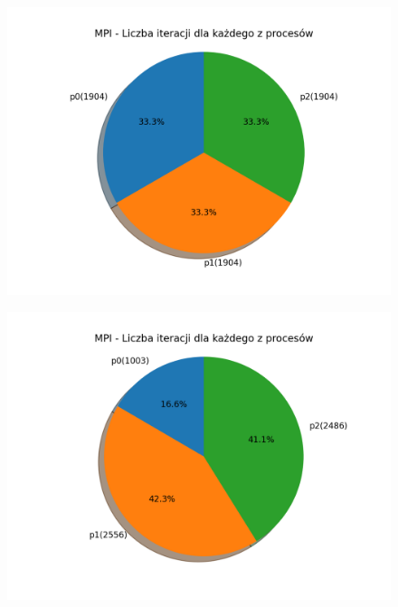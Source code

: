 \documentclass[11pt, a4paper, oneside]{article}
\begin{document}
\begin{figure}[H]
\centering
\begin{minipage}[b]{\dimexpr.5\textwidth-1em}
  \centering
  \includegraphics[width=1\linewidth]{grafiki2/MPI_PSO_T2/MPI_PSO_T2_procIter.png}
  \label{fig:trajektoriaWybrana:PSO2}
\end{minipage} \hfill
\begin{minipage}[b]{\dimexpr.5\textwidth-1em}
  \centering
  \includegraphics[width=1\linewidth]{grafiki2/MPI_MC_T2/MPI_MC_T2_procIter.png}
  \label{fig:trajektoriaWybrana:MC2}
\end{minipage}
\end{figure}
\end{document}
